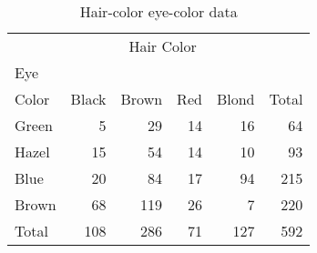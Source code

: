 \begin{table}[htb]

\caption{Hair-color eye-color data}\label{tab:hairdat}
\begin{center}
\begin{tabular}{|lrrrr|r|}
\hline
        & \multicolumn{4}{c|}{Hair Color}        & \\
Eye     &         &         &         &         &       \\
Color   &  Black  &  Brown  &    Red  &  Blond  & Total \\[2ex] \hline
Green   &      5  &     29  &     14  &     16  &    64 \\
Hazel   &     15  &     54  &     14  &     10  &    93 \\
Blue    &     20  &     84  &     17  &     94  &   215 \\
Brown   &     68  &    119  &     26  &      7  &   220 \\[1ex] \hline
Total   &    108  &    286  &     71  &    127  &   592 \\ \hline
\end{tabular}
\end{center}
\end{table}

